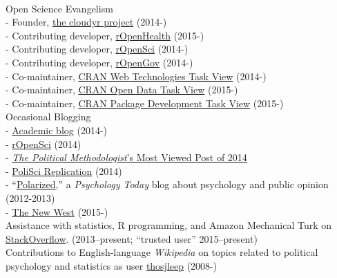 \documentclass[12pt]{article}
\renewcommand{\section}[1]{\pagebreak[3]%
    \llap{\scshape\smash{\parbox[t]{\marginparwidth}{\raggedright {\color{lg}#1}}}}%
    \vspace{-\baselineskip}\par}
\newcommand{\topic}[1]{\pagebreak[3]\indent {\color{lg}{\footnotesize #1 }}\\}
\newcommand{\entry}[1]{\indent {\color{lg}\guillemotright}\hspace{2pt}#1\vspace{.25em}\\}
\newcommand{\subentry}[1]{{\color{lg}-} #1\vspace{.25em}\\}
\begin{document}
\topic{Public Engagement}
\entry{Open Science Evangelism}
\subentry{Founder, \href{http://cloudyr.github.io/}{the cloudyr project} (2014-)}
\subentry{Contributing developer, \href{http://ropensci.org/}{rOpenHealth} (2015-)}
\subentry{Contributing developer, \href{http://ropensci.org/}{rOpenSci} (2014-)}
\subentry{Contributing developer, \href{http://ropengov.github.io/}{rOpenGov} (2014-)}
\subentry{Co-maintainer, \href{http://cran.r-project.org/web/views/WebTechnologies.html}{CRAN Web Technologies Task View} (2014-)}
\subentry{Co-maintainer, \href{https://www.github.com/ropensci/opendata}{CRAN Open Data Task View} (2015-)}
\subentry{Co-maintainer, \href{https://www.github.com/leeper/PackageDevelopment}{CRAN Package Development Task View} (2015-)}
\entry{Occasional Blogging}
\subentry{\href{http://thomasleeper.com/blog}{Academic blog} (2014-)}
\subentry{\href{http://ropensci.org/blog/}{rOpenSci} (2014)}
\subentry{\href{http://thepoliticalmethodologist.com/2015/01/05/introducing-the-annual-tpm-most-viewed-post-award-and-our-2014-winner/}{\textit{The Political Methodologist}'s Most Viewed Post of 2014}}
\subentry{\href{http://politicalsciencereplication.wordpress.com/}{PoliSci Replication} (2014)}
\subentry{``\href{http://www.psychologytoday.com/blog/polarized}{Polarized},'' a {\em Psychology Today} blog about psychology and public opinion (2012-2013)}
\subentry{\href{https://thewpsa.wordpress.com/2015/05/09/what-can-we-learn-from-10-1-million-facebook-users-its-complicated/}{The New West} (2015-)}
\entry{Assistance with statistics, R programming, and Amazon Mechanical Turk on \href{http://stackoverflow.com/users/2338862/thomas}{StackOverflow}. (2013--present; ``trusted user'' 2015--present)}
\entry{Contributions to English-language {\em Wikipedia} on topics related to political psychology and statistics as user \href{http://en.wikipedia.org/wiki/Special:Contributions/Thosjleep}{thosjleep} (2008-)}

\end{document}
